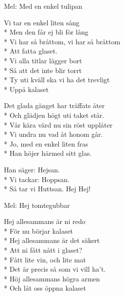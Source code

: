 

\pagestyle{Phörphesten}


\begin{SongText}
    \begin{SongInfo}
        Mel: Med en enkel tulipan
    \end{SongInfo}
    \begin{SongVerse}
        Vi tar en enkel liten sång\\*%
        Men den får ej bli för lång\\*%
        Vi har så bråttom, vi har så bråttom\\*%
        Att fatta glaset.\\*%
        Vi alla titlar lägger bort\\*%
        Så att det inte blir torrt\\*%
        Ty uti kväll ska vi ha det trevligt\\*%
        Uppå kalaset
    \end{SongVerse}
    \begin{SongVerse}
        Det glada gänget har träffats åter\\*%
        Och glädjen högt uti taket står.\\*%
        Vår kära värd nu sin röst upplåter\\*%
        Vi undra nu vad åt honom går.\\*%
        Jo, med en enkel liten fras\\*%
        Han höjer härmed sitt glas.
    \end{SongVerse}
    \begin{SongVerse}
        Han säger: Hejsan.\\*%
        Vi tackar: Hoppsan.\\*%
        Så tar vi Huttsan. Hej Hej!
    \end{SongVerse}
\end{SongText}

\begin{SongText}
    \begin{SongInfo}
        Mel: Hej tomtegubbar
    \end{SongInfo}
    \begin{SongVerse}
        Hej allesammans är ni redo\\*%
        För nu börjar kalaset\\*%
        Hej allesammans är det säkert\\*%
        Att ni fått nått i glaset?\\*%
        Fått lite vin, och lite mat\\*%
        Det är precis så som vi vill ha’t.\\*%
        Höj allesammans högra armen\\*%
        Och låt oss öppna kalaset
    \end{SongVerse}
\end{SongText}

